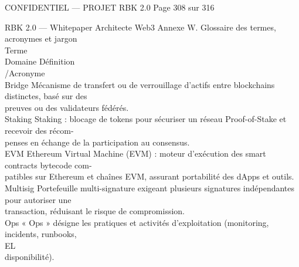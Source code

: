 \documentclass[12pt,landscape,a4paper]{article}
\newenvironment{confidential}
{\begin{tcolorbox}[
    colback=rbkred!5!white,
    colframe=rbkred!75!black,
    title=CONFIDENTIEL,
    fonttitle=\bfseries\color{white},
    coltitle=rbkred!75!black,
    breakable,
    enhanced,
    frame hidden,
    borderline west={2pt}{0pt}{rbkred!75!black}
]}
{\end{tcolorbox}}
\begin{document}
\vspace{0.5em}
\begin{confidential}CONFIDENTIEL — PROJET RBK 2.0                    Page 308 sur 316\end{confidential}
RBK 2.0 — Whitepaper Architecte Web3                                               Annexe W. Glossaire des termes, acronymes et jargon\\
\vspace{0.5em}
\vspace{0.5em}
Terme\\
Domaine    Définition\\
/Acronyme\\
Bridge                                  Mécanisme de transfert ou de verrouillage d’actifs entre blockchains distinctes, basé sur des\\
preuves ou des validateurs fédérés.\\
\vspace{0.5em}
Staking                                 Staking : blocage de tokens pour sécuriser un réseau Proof-of-Stake et recevoir des récom-\\
penses en échange de la participation au consensus.\\
\vspace{0.5em}
EVM                                     Ethereum Virtual Machine (EVM) : moteur d’exécution des smart contracts bytecode com-\\
patibles sur Ethereum et chaînes EVM, assurant portabilité des dApps et outils.\\
\vspace{0.5em}
Multisig                                Portefeuille multi-signature exigeant plusieurs signatures indépendantes pour autoriser une\\
transaction, réduisant le risque de compromission.\\
\vspace{0.5em}
Ops                                     « Ops » désigne les pratiques et activités d’exploitation (monitoring, incidents, runbooks,\\
\vspace{0.5em}
\vspace{0.5em}
\vspace{0.5em}
\vspace{0.5em}
EL\\
disponibilité).\\
\vspace{0.5em}
\vspace{0.5em}
\vspace{0.5em}
\end{document}
